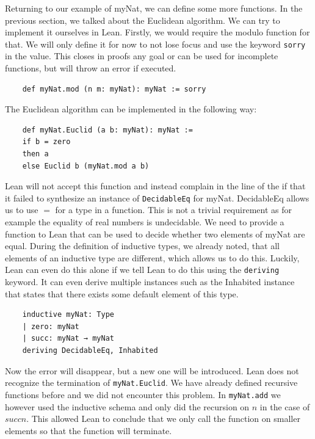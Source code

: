 Returning to our example of myNat, we can define some more functions. In the previous section, we talked about the Euclidean algorithm. We can try to implement it ourselves in Lean. Firstly, we would require the modulo function for that. We will only define it for now to not lose focus and use the keyword \lstinline|sorry| in the value. This closes in proofs any goal or can be used for incomplete functions, but will throw an error if executed.

\begin{lstlisting}
    def myNat.mod (n m: myNat): myNat := sorry
\end{lstlisting}

The Euclidean algorithm can be implemented in the following way:

\begin{lstlisting}
    def myNat.Euclid (a b: myNat): myNat :=
    if b = zero
    then a
    else Euclid b (myNat.mod a b)
\end{lstlisting}

Lean will not accept this function and instead complain in the line of the if that it failed to synthesize an instance of \lstinline|DecidableEq| for myNat. DecidableEq allows us to use $=$ for a type in a function. This is not a trivial requirement as for example the equality of real numbers is undecidable\cite{EqualityRealNumber}. We need to provide a function to Lean that can be used to decide whether two elements of myNat are equal. During the definition of inductive types, we already noted, that all elements of an inductive type are different, which allows us to do this. Luckily, Lean can even do this alone if we tell Lean to do this using the \lstinline|deriving| keyword. It can even derive multiple instances such as the Inhabited instance that states that there exists some default element of this type.

\begin{lstlisting}
    inductive myNat: Type
    | zero: myNat
    | succ: myNat → myNat
    deriving DecidableEq, Inhabited

\end{lstlisting}

Now the error will disappear, but a new one will be introduced. Lean does not recognize the termination of \lstinline|myNat.Euclid|. We have already defined recursive functions before and we did not encounter this problem. In \lstinline|myNat.add| we however used the inductive schema and only did the recursion on $n$ in the case of $succ n$. This allowed Lean to conclude that we only call the function on smaller elements so that the function will terminate.

